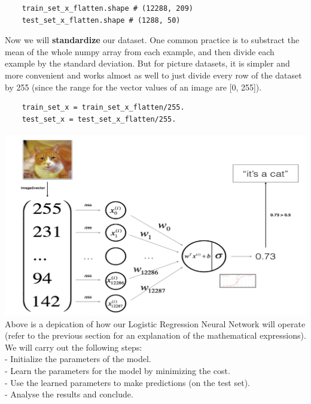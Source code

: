 \documentclass[11pt, a4paper]{article}
\begin{document}
\begin{spacing}{1.1}
\begin{lstlisting}
	train_set_x_flatten.shape # (12288, 209)
	test_set_x_flatten.shape # (1288, 50) \end{lstlisting} \vspace*{1mm} 
	Now we will \textbf{standardize} our dataset. One common practice is to substract the mean of the whole numpy array from each example, and then divide each example by the standard deviation. But for picture datasets, it is simpler and more convenient and works almost as well to just divide every row of the dataset by 255 (since the range for the vector values of an image are [0, 255]). 
	\begin{lstlisting}
	train_set_x = train_set_x_flatten/255.
	test_set_x = test_set_x_flatten/255. \end{lstlisting} \vspace*{1mm} 
	\hspace*{16mm} \includegraphics[scale=.5]{cat_log} \\
	Above is a depication of how our Logistic Regression Neural Network will operate (refer to the previous section for an explanation of the mathematical expressions). We will carry out the following steps: \\
	\hspace*{3mm} - Initialize the parameters of the model. \\
	\hspace*{3mm} - Learn the parameters for the model by minimizing the cost. \\
	\hspace*{3mm} - Use the learned parameters to make predictions (on the test set). \\
	\hspace*{3mm} - Analyse the results and conclude. \vspace*{2mm} \\

\end{spacing}
\end{document}
